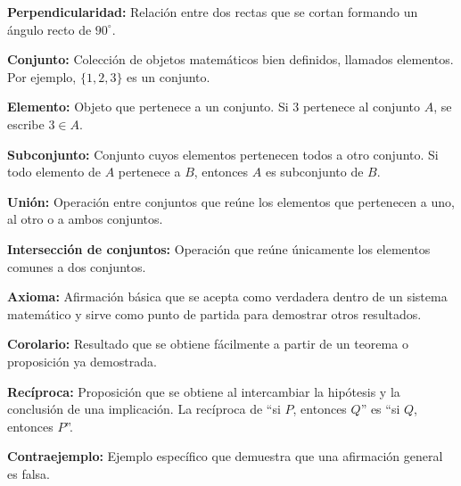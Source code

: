 \documentclass[12pt,final]{report}
\theoremstyle{plain}
\theoremstyle{definition}
\begin{document}
\textbf{Perpendicularidad:} Relación entre dos rectas que se cortan formando un ángulo recto de $90^\circ$.

\vspace{0.5em}

\textbf{Conjunto:} Colección de objetos matemáticos bien definidos, llamados elementos. Por ejemplo, $\{1,2,3\}$ es un conjunto.

\vspace{0.5em}

\textbf{Elemento:} Objeto que pertenece a un conjunto. Si $3$ pertenece al conjunto $A$, se escribe $3 \in A$.

\vspace{0.5em}

\textbf{Subconjunto:} Conjunto cuyos elementos pertenecen todos a otro conjunto. Si todo elemento de $A$ pertenece a $B$, entonces $A$ es subconjunto de $B$.

\vspace{0.5em}

\textbf{Unión:} Operación entre conjuntos que reúne los elementos que pertenecen a uno, al otro o a ambos conjuntos.

\vspace{0.5em}

\textbf{Intersección de conjuntos:} Operación que reúne únicamente los elementos comunes a dos conjuntos.

\vspace{0.5em}

\textbf{Axioma:} Afirmación básica que se acepta como verdadera dentro de un sistema matemático y sirve como punto de partida para demostrar otros resultados.

\vspace{0.5em}

\textbf{Corolario:} Resultado que se obtiene fácilmente a partir de un teorema o proposición ya demostrada.

\vspace{0.5em}

\textbf{Recíproca:} Proposición que se obtiene al intercambiar la hipótesis y la conclusión de una implicación. La recíproca de ``si $P$, entonces $Q$'' es ``si $Q$, entonces $P$''.

\vspace{0.5em}

\textbf{Contraejemplo:} Ejemplo específico que demuestra que una afirmación general es falsa.

\vspace{0.5em}
\end{document}
